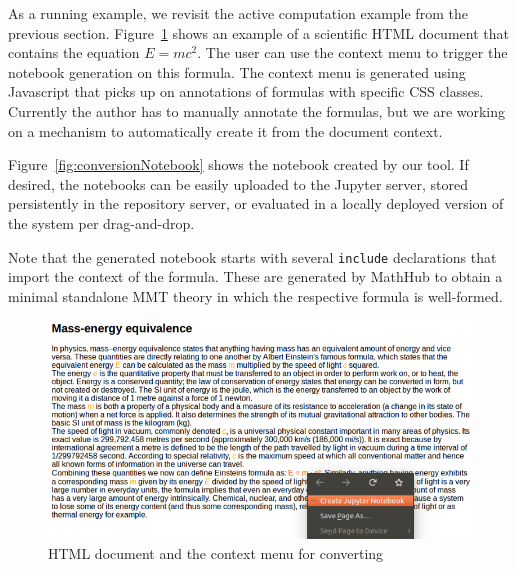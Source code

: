 As a running example, we revisit the active computation example from the previous section.
Figure~\ref{fig:conversionHTML} shows an example of a scientific HTML document that contains the equation $E=mc^2$.
The user can use the context menu to trigger the notebook generation on this formula.
The context menu is generated using Javascript that picks up on annotations of formulas with specific CSS classes.
Currently the author has to manually annotate the formulas, but we are working on a mechanism to automatically create it from the document context.

Figure~\ref{fig:conversionNotebook} shows the notebook created by our tool.
If desired, the notebooks can be easily uploaded to the Jupyter server, stored persistently in the repository server, or evaluated in a locally deployed version of the system per drag-and-drop.

Note that the generated notebook starts with several \texttt{include} declarations that import the context of the formula.
These are generated by MathHub to obtain a minimal standalone MMT theory in which the respective formula is well-formed. 


\begin{figure}[ht]\centering
\includegraphics[width=12cm]{conversionHTML}
\caption{HTML document and the context menu for converting}
\label{fig:conversionHTML}
\end{figure}

